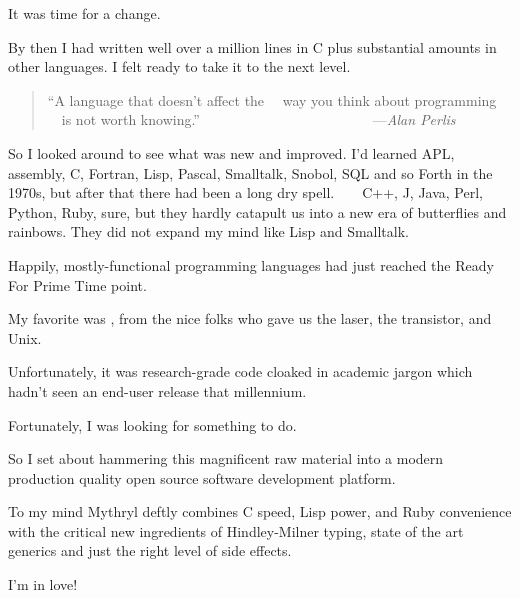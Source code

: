 It was time for a change.

By then I had written well over a million lines
in C plus substantial amounts in other languages.
I felt ready to take it to the next level.

\begin{quote}\begin{tiny}
       ``A language that doesn't affect the\newline
       ~~way you think about programming\newline
       ~~is not worth knowing.''\newline
       ~~~~~~~~~~~~~~~~~~~~~~~~---{\em Alan Perlis}
\end{tiny}\end{quote}

So I looked around to see what was new and improved.  I'd learned 
{\sc APL}, assembly, C, Fortran, Lisp, Pascal, Smalltalk, Snobol, 
{\sc SQL} and so Forth in the 1970s, 
but after that there had been a long dry spell.~~~~C++, J, Java, Perl, 
Python, Ruby, sure, but they hardly catapult us into a new era of 
butterflies and rainbows.  They did not expand my mind 
like Lisp and Smalltalk. 

Happily, mostly-functional programming languages had 
just reached the Ready For Prime Time point.

My favorite was , from the 
nice folks who gave us the laser, the transistor, 
and Unix.

Unfortunately, it was research-grade code cloaked in 
academic jargon which hadn't seen an end-user release that 
millennium.

Fortunately, I was looking for something to do. 

So I set about hammering 
this magnificent raw material into a modern production quality 
open source software development platform. 

To my mind Mythryl deftly combines C speed, 
Lisp power, and Ruby convenience 
with the critical new ingredients of Hindley-Milner typing, 
state of the art generics and just the right level of side effects.

I'm in love!


















\appendix






